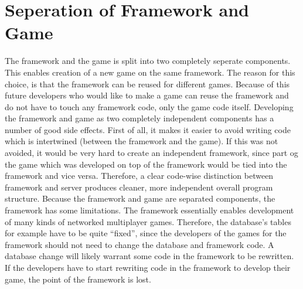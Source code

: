\section{Seperation of Framework and Game}
The framework and the game is split into two completely seperate components. This enables creation of a new game on the same framework. 
The reason for this choice, is that the framework can be reused for different games. Because of this future developers who would like to make a game can reuse the framework and do not have to touch any framework code, only the game code itself. 
Developing the framework and game as two completely independent components has a number of good side effects. First of all, it makes it easier to avoid writing code which is intertwined (between the framework and the game). 
If this was not avoided, it would be very hard to create an independent framework, since part og the game which was developed on top of the framework would be tied into the framework and vice versa. Therefore, a clear code-wise distinction between framework and server produces cleaner, more independent overall program structure. 
Because the framework and game are separated components, the framework has some limitations. The framework essentially enables development of many kinds of networked multiplayer games. Therefore, the database's tables for example have to be quite ``fixed'', since the developers of the games for the framework should not need to change the database and framework code. A database change will likely warrant some code in the framework to be rewritten. If the developers have to start rewriting code in the framework to develop their game, the point of the framework is lost. 